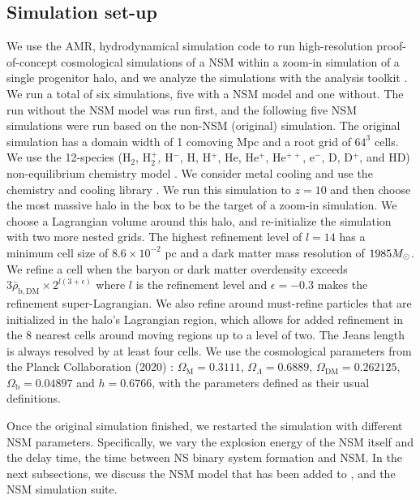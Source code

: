 \documentclass[fleqn,usenatbib]{mnras}
\begin{document}
\subsection{Simulation set-up} \label{sec:NSM_simulation}

We use the AMR, hydrodynamical simulation code \enzo{} \citep{Enzo} to run high-resolution proof-of-concept cosmological simulations of a NSM within a zoom-in simulation of a single progenitor halo, and we analyze the simulations with the analysis toolkit \yt{} \citep{yt_full_paper}. We run a total of six simulations, five with a NSM model and one without. The run without the NSM model was run first, and the following five NSM simulations were run based on the non-NSM (original) simulation. The original simulation has a domain width of 1 comoving Mpc and a root grid of $64^{3}$ cells. We use the 12-species (H$_{2}$, H$_{2}^{+}$, H$^{-}$, H, H$^{+}$, He, He$^{+}$, He$^{++}$, e$^{-}$, D, D$^{+}$, and HD) non-equilibrium chemistry model \citep{Abel97, Anninos97}. We consider metal cooling and use the chemistry and cooling library \grackle{} \citep{grackle}. We run this simulation to $z = 10$ and then choose the most massive halo in the box to be the target of a zoom-in simulation. We choose a Lagrangian volume around this halo, and re-initialize the simulation with two more nested grids. The highest refinement level of $l = 14$ has a minimum cell size of $8.6 \times 10^{-2}$ pc and a dark matter mass resolution of $1985 \Ms$. We refine a cell when the baryon or dark matter overdensity exceeds $3 \bar{\rho}_{\mathrm{b, DM}} \times 2^{l (3 + \epsilon)}$ where $l$ is the refinement level and $\epsilon = -0.3$ makes the refinement super-Lagrangian. We also refine around must-refine particles that are initialized in the halo's Lagrangian region, which allows for added refinement in the 8 nearest cells around moving regions up to a level of two. The Jeans length is always resolved by at least four cells. We use the cosmological parameters from the Planck Collaboration (2020) \citep{Planck18_Cosmo}: $\Omega_{\mathrm{M}} = 0.3111$, $\Omega_{\Lambda} = 0.6889$, $\Omega_{\mathrm{DM}} = 0.262125$, $\Omega_{\mathrm{b}} = 0.04897$ and $h = 0.6766$, with the parameters defined as their usual definitions.

Once the original simulation finished, we restarted the simulation with different NSM parameters. Specifically, we vary the explosion energy of the NSM itself and the delay time, the time between NS binary system formation and NSM. In the next subsections, we discuss the NSM model that has been added to \enzo{}, and the NSM simulation suite.
\end{document}

